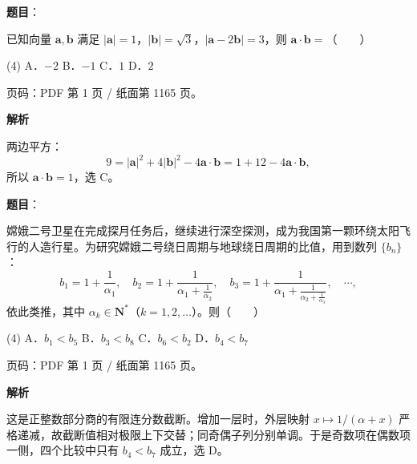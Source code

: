 \begin{answer}

\textbf{题目}：

已知向量 $\boldsymbol a,\boldsymbol b$ 满足 $|\boldsymbol a|=1$，$|\boldsymbol b|=\sqrt3$，$|\boldsymbol a-2\boldsymbol b|=3$，则 $\boldsymbol a\cdot\boldsymbol b=$\mbox{（　　）}

\begin{gkopts}(4)
\task A．$-2$
\task B．$-1$
\task C．$1$
\task D．$2$
\end{gkopts}

\begin{gktip}
页码：PDF 第 1 页 / 纸面第 1165 页。
\end{gktip}

\textbf{解析}

两边平方：
\nopagebreak[4]
\[
9=|\boldsymbol a|^2+4|\boldsymbol b|^2-4\boldsymbol a\cdot\boldsymbol b
=1+12-4\boldsymbol a\cdot\boldsymbol b,
\]
所以 $\boldsymbol a\cdot\boldsymbol b=1$，选 C。


\end{answer}
\begin{answer}

\textbf{题目}：

嫦娥二号卫星在完成探月任务后，继续进行深空探测，成为我国第一颗环绕太阳飞行的人造行星。为研究嫦娥二号绕日周期与地球绕日周期的比值，用到数列 $\{b_n\}$：
\nopagebreak[4]
\[
b_1=1+\frac1{\alpha_1},\quad
b_2=1+\frac1{\alpha_1+\frac1{\alpha_2}},\quad
b_3=1+\frac1{\alpha_1+\frac1{\alpha_2+\frac1{\alpha_3}}},\quad\cdots,
\]
依此类推，其中 $\alpha_k\in\mathbf N^*$（$k=1,2,\ldots$）。则\mbox{（　　）}

\begin{gkopts}(4)
\task A．$b_1<b_5$
\task B．$b_3<b_8$
\task C．$b_6<b_2$
\task D．$b_4<b_7$
\end{gkopts}

\begin{gktip}
页码：PDF 第 1 页 / 纸面第 1165 页。
\end{gktip}

\textbf{解析}

这是正整数部分商的有限连分数截断。增加一层时，外层映射 $x\mapsto1/(\alpha+x)$ 严格递减，故截断值相对极限上下交替；同奇偶子列分别单调。于是奇数项在偶数项一侧，四个比较中只有 $b_4<b_7$ 成立，选 D。


\end{answer}

